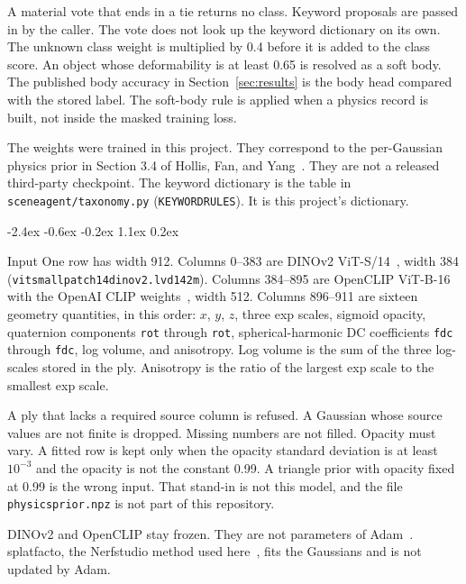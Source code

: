 \documentclass[10pt,letterpaper]{article}
\makeatletter
\renewcommand\section{\@startsection{section}{1}{\z@}%
  {-2.4ex \@plus -0.6ex \@minus -0.2ex}%
  {1.1ex \@plus 0.2ex}%
  {\large\bfseries\raggedright}}
\DeclareRobustCommand{\_}{\textunderscore\allowbreak}
\makeatother
\begin{document}
A material vote that ends in a tie returns no class.
Keyword proposals are passed in by the caller.
The vote does not look up the keyword dictionary on its own.
The unknown class weight is multiplied by 0.4 before it is added to the class score.
An object whose deformability is at least 0.65 is resolved as a soft body.
The published body accuracy in Section~\ref{sec:results} is the body head compared with the stored label.
The soft-body rule is applied when a physics record is built, not inside the masked training loss.

The weights were trained in this project.
They correspond to the per-Gaussian physics prior in Section 3.4 of Hollis, Fan, and Yang~\cite{hollis2026sceneagent}.
They are not a released third-party checkpoint.
The keyword dictionary is the table in \texttt{sceneagent/taxonomy.py} (\texttt{\_KEYWORD\_RULES}).
It is this project's dictionary.

\section{Input}
One row has width 912.
Columns 0--383 are DINOv2 ViT-S/14~\cite{oquab2024dinov2}, width 384 (\texttt{vit\_small\_patch14\_dinov2.lvd142m}).
Columns 384--895 are OpenCLIP ViT-B-16~\cite{cherti2023reproducible} with the OpenAI CLIP weights~\cite{radford2021clip}, width 512.
Columns 896--911 are sixteen geometry quantities, in this order: \(x\), \(y\), \(z\), three exp scales, sigmoid opacity, quaternion components \texttt{rot\_0} through \texttt{rot\_3}, spherical-harmonic DC coefficients \texttt{f\_dc\_0} through \texttt{f\_dc\_2}, log volume, and anisotropy.
Log volume is the sum of the three log-scales stored in the ply.
Anisotropy is the ratio of the largest exp scale to the smallest exp scale.

A ply that lacks a required source column is refused.
A Gaussian whose source values are not finite is dropped.
Missing numbers are not filled.
Opacity must vary.
A fitted row is kept only when the opacity standard deviation is at least \(10^{-3}\) and the opacity is not the constant 0.99.
A triangle prior with opacity fixed at 0.99 is the wrong input.
That stand-in is not this model, and the file \texttt{physics\_prior.npz} is not part of this repository.

DINOv2 and OpenCLIP stay frozen.
They are not parameters of Adam~\cite{kingma2015adam}.
splatfacto, the Nerfstudio method used here~\cite{tancik2023nerfstudio}, fits the Gaussians and is not updated by Adam.
\end{document}
